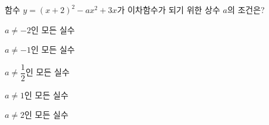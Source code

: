 함수 $y=(x+2)^2-ax^2+3x$가 이차함수가 되기 위한 상수 $a$의 조건은?
\begin{choicesii}{\rule[-3ex]{0pt}{8ex}$a\ne -2$인 모든 실수}{\rule[-3ex]{0pt}{8ex}$a\ne -1$인 모든 실수}{\rule[-3ex]{0pt}{8ex}$a\ne \dfrac{1}{2}$인 모든 실수}{\rule[-3ex]{0pt}{8ex}$a\ne 1$인 모든 실수}{\rule[-3ex]{0pt}{8ex}$a\ne 2$인 모든 실수}\end{choicesii}
